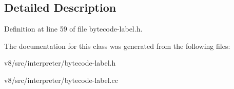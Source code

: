 \subsection{Detailed Description}


Definition at line 59 of file bytecode-\/label.\+h.



The documentation for this class was generated from the following files\+:\begin{DoxyCompactItemize}
\item 
v8/src/interpreter/bytecode-\/label.\+h\item 
v8/src/interpreter/bytecode-\/label.\+cc\end{DoxyCompactItemize}
